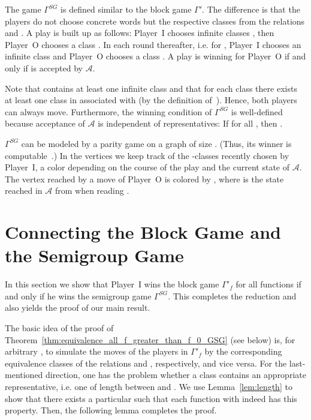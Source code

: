 \documentclass[fleqn,envcountsame]{LMCS}
\newcommand{\aut}[1]{\ensuremath{\mathcal{#1}}}
\newcommand{\pI}{Player~I\xspace}
\newcommand{\pO}{Player~O\xspace}
\newcommand{\GSG}{\ensuremath{\Gamma^{SG}}\xspace}
\newcommand{\Gp}[1]{\ensuremath{\Gamma'_{#1}}\xspace}
\newcommand{\Gpempty}{\ensuremath{\Gamma'}\xspace}
\newcommand{\ie}{i.e.\xspace}
\begin{document}
The game \GSG is defined similar to the block game \Gpempty.
The difference is that the players do not choose concrete words but the
respective classes from the relations  and . A play is
built up as follows: \pI chooses infinite classes
, then \pO chooses a class
. In each round thereafter,
\ie for , \pI chooses an infinite class
 and \pO chooses a class
.
A play is winning for \pO if and only if
 is accepted
by \aut{A}.

Note that  contains at least one infinite class and that
for each class  there exists at least one class in 
associated with  (by the definition of~).
Hence, both players can always move.
Furthermore, the winning condition of \GSG is well-defined
because acceptance of \aut{A} is independent of representatives:
If  for all , then
.

\GSG\label{pageref:size_of_GSG} can be modeled by a parity game on a graph of size .
(Thus, its winner is computable~\cite{GTW02AutLogInfGam}.)
In the vertices we keep track of the -classes recently chosen by \pI,
a color depending on the course of the play and
the current state  of \aut{A}. The vertex reached by
a move  of \pO is colored by ,
where  is the state reached in \aut{A} from  when reading .



\section{Connecting the Block Game and the Semigroup Game}\label{sec:connection_block_semigroup_game}
In this section we show that \pI wins the block game \Gp{f} for all
functions  if and only if he wins the semigroup game \GSG.
This completes the reduction and also yields the proof of our main result.

The basic idea of the proof of Theorem~\ref{thm:equivalence_all_f_greater_than_f_0_GSG} (see below)
is, for arbitrary , to simulate the moves of the players in \Gp{f} by the corresponding
equivalence classes of the relations  and , respectively, and vice versa.
For the last-mentioned direction,
one has the problem whether a class  contains an
appropriate representative, \ie one of length between  and .
We use Lemma~\ref{lem:length} to show that there exists a particular 
such that each function  with  indeed has this property.
Then, the following lemma completes the proof.
\end{document}
